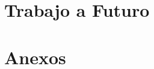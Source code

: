 \documentclass[12pt, letterpaper]{report}
\begin{document}
\chapter{Trabajo a Futuro}


\nocite{*} %



\appendix
\chapter{Anexos}

\end{document}

